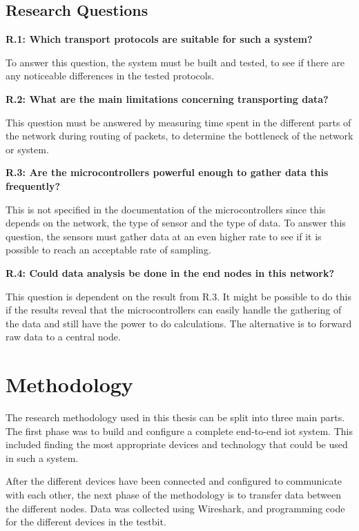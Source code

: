 \subsection{Research Questions}

\noindent \textbf{R.1: Which transport protocols are suitable for such a system?}

\noindent To answer this question, the system must be built and tested, to see if there are any noticeable differences in the tested protocols.

\noindent\textbf{R.2: What are the main limitations concerning transporting data?}

\noindent This question must be answered by measuring time spent in the different parts of the network during routing of packets, to determine the bottleneck of the network or system. 

\noindent\textbf{R.3: Are the \glspl{microcontroller} powerful enough to gather data this frequently?}

\noindent This is not specified in the documentation of the \glspl{microcontroller} since this depends on the network, the type of sensor and the type of data. To answer this question, the sensors must gather data at an even higher rate to see if it is possible to reach an acceptable rate of sampling. 

\noindent\textbf{R.4: Could data analysis be done in the end nodes in this network?}

\noindent This question is dependent on the result from R.3. It might be possible to do this if the results reveal that the \glspl{microcontroller} can easily handle the gathering of the data and still have the power to do calculations. The alternative is to forward raw data to a central node. 

\section{Methodology}

The research methodology used in this thesis can be split into three main parts. The first phase was to build and configure a complete end-to-end \gls{iot} system. This included finding the most appropriate devices and technology that could be used in such a system. 

After the different devices have been connected and configured to communicate with each other, the next phase of the methodology is to transfer data between the different nodes. Data was collected using Wireshark, and programming code for the different devices in the testbit. 

